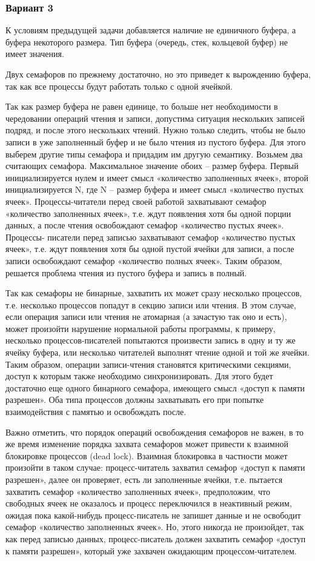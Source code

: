 \documentclass[a4paper]{article}
\begin{document}
	\subsubsection{Вариант 3}	
	К условиям предыдущей задачи добавляется наличие не единичного буфера, а буфера некоторого размера. Тип буфера (очередь, стек, кольцевой буфер) не имеет значения.
	
	Двух семафоров по прежнему достаточно, но это приведет к вырождению буфера, так как все процессы будут работать только с одной ячейкой.
	
	Так как размер буфера не равен единице, то больше нет необходимости в чередовании операций чтения и записи, допустима ситуация нескольких записей подряд, и после этого нескольких чтений. Нужно только следить, чтобы не было записи в уже заполненный буфер и не было чтения из пустого буфера. Для этого выберем другие типы семафора и придадим им другую семантику. Возьмем два считающих семафора. Максимальное значение обоих – размер буфера. Первый инициализируется нулем и имеет смысл «количество заполненных ячеек», второй инициализируется N, где N – размер буфера и имеет смысл «количество пустых ячеек». Процессы-читатели перед своей работой захватывают семафор «количество заполненных ячеек», т.е. ждут появления хотя бы одной порции данных, а после чтения освобождают семафор «количество пустых ячеек». Процессы- писатели перед записью захватывают семафор «количество пустых ячеек», т.е. ждут появления хотя бы одной пустой ячейки для записи, а после записи освобождают семафор «количество полных ячеек». Таким образом, решается проблема чтения из пустого буфера и запись в полный.
	
	Так как семафоры не бинарные, захватить их может сразу несколько процессов, т.е. несколько процессов попадут в секцию записи или чтения. В этом случае, если операция записи или чтения не атомарная (а зачастую так оно и есть), может произойти нарушение нормальной работы программы, к примеру, несколько процессов-писателей попытаются произвести запись в одну и ту же ячейку буфера, или несколько читателей выполнят чтение одной и той же ячейки. Таким образом, операции записи-чтения становятся критическими секциями, доступ к которым также необходимо синхронизировать. Для этого будет достаточно еще одного бинарного семафора, имеющего смысл «доступ к памяти разрешен». Оба типа процессов должны захватывать его при попытке взаимодействия с памятью и освобождать после.
	
	Важно отметить, что порядок операций освобождения семафоров не важен, в то же время изменение порядка захвата семафоров может привести к взаимной блокировке процессов (dead lock). Взаимная блокировка в частности может произойти в таком случае: процесс-читатель захватил семафор «доступ к памяти разрешен», далее он проверяет, есть ли заполненные ячейки, т.е. пытается захватить семафор «количество заполненных ячеек», предположим, что свободных ячеек не оказалось и процесс переключился в неактивный режим, ожидая пока какой-нибудь процесс-писатель не запишет данные и не освободит семафор «количество заполненных ячеек». Но, этого никогда не произойдет, так как перед записью данных, процесс-писатель должен захватить семафор «доступ к памяти разрешен», который уже захвачен ожидающим процессом-читателем.
	
\end{document}
